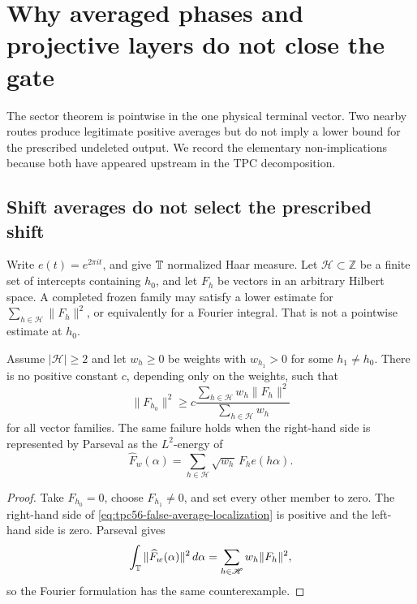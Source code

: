 \section{Why averaged phases and projective layers do not close the gate}
\label{sec:transport-boundaries}

The sector theorem is pointwise in the one physical terminal vector.  Two
nearby routes produce legitimate positive averages but do not imply a lower
bound for the prescribed undeleted output.  We record the elementary
non-implications because both have appeared upstream in the TPC
decomposition.

\subsection{Shift averages do not select the prescribed shift}

Write \(e(t)=e^{2\pi i t}\), and give \(\mathbb T\) normalized Haar measure.
Let \(\mathscr H\subset\mathbb Z\) be a finite set of intercepts containing
\(h_0\), and
let \(F_h\) be vectors in an arbitrary Hilbert space.  A completed frozen
family may satisfy a lower estimate for
\(\sum_{h\in\mathscr H}\|F_h\|^2\), or equivalently for a Fourier integral.
That is not a pointwise estimate at \(h_0\).

\begin{proposition}
\label{prop:tpc56-fixed-member-nonlocalization}
Assume \(|\mathscr H|\ge2\) and let \(w_h\ge0\) be weights with
\(w_{h_1}>0\) for some \(h_1\ne h_0\).  There is no positive constant
\(c\), depending only on the weights, such that
\begin{equation}
 \|F_{h_0}\|^2
 \ge c\frac{\sum_{h\in\mathscr H}w_h\|F_h\|^2}
              {\sum_{h\in\mathscr H}w_h}
 \label{eq:tpc56-false-average-localization}
\end{equation}
for all vector families.  The same failure holds when the right-hand side
is represented by Parseval as the \(L^2\)-energy of
\begin{equation}
 \widehat F_w(\alpha)
 =\sum_{h\in\mathscr H}\sqrt{w_h}\,F_he(h\alpha).
 \label{eq:tpc56-frozen-fourier-family}
\end{equation}
\end{proposition}

\begin{proof}
Take \(F_{h_0}=0\), choose \(F_{h_1}\ne0\), and set every other member to
zero.  The right-hand side of
\eqref{eq:tpc56-false-average-localization} is positive and the left-hand
side is zero.  Parseval gives
\begin{equation}
 \int_{\mathbb T}\|\widehat F_w(\alpha)\|^2\,d\alpha
 =\sum_{h\in\mathscr H}w_h\|F_h\|^2,
 \label{eq:tpc56-parseval-shift-average}
\end{equation}
so the Fourier formulation has the same counterexample.
\end{proof}

